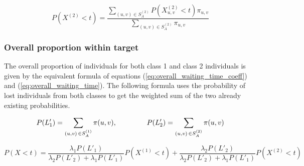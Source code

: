 \begin{equation}
    P(X^{(2)} < t) = \frac{\sum_{(u,v) \in S_A^{(2)}} P(X_{u,v}^{(2)} < t) 
    \pi_{u,v} }{\sum_{(u,v) \in S_A^{(2)}} \pi_{u,v}}
\end{equation}


\subsubsection{Overall proportion within target}

The overall proportion of individuals for both class 1 and class 2 individuals
is given by the equivalent formula of equations 
(\ref{eq:overall_waiting_time_coeff}) and (\ref{eq:overall_waiting_time}).
The following formula uses the probability of lost individuals from both classes
to get the weighted sum of the two already existing probabilities.

\begin{equation*}
    P(L'_1) = \sum_{(u,v) \, \in S_A^{(1)}} \pi(u,v), \hspace{1.5cm}
    P(L'_2) = \sum_{(u,v) \, \in S_A^{(2)}} \pi(u,v)
\end{equation*}

\begin{equation}\label{eq:overall_proportion_within_target}
    P(X < t)= \frac{\lambda_1 P(L'_1)}{\lambda_2 P(L'_2)+\lambda_1 P(L'_1)} 
    P(X^{(1)} < t) + \frac{\lambda_2 P(L'_2)}{\lambda_2 P(L'_2) + \lambda_1 
    P(L'_1)} P(X^{(2)} < t)
\end{equation}


